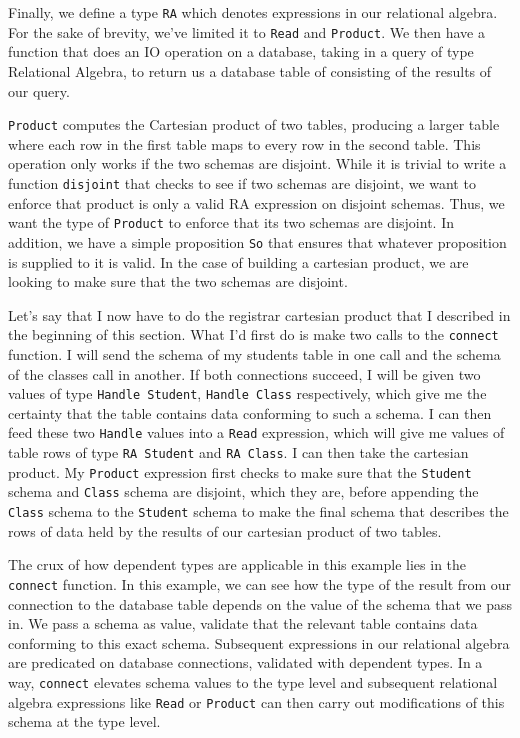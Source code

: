 Finally, we define a type \texttt{RA} which denotes expressions in our
relational algebra. For the sake of brevity, we've limited it to \texttt{Read}
and \texttt{Product}. We then have a function that does an IO operation on a
database, taking in a query of type Relational Algebra, to return us a database
table of consisting of the results of our query. 

\texttt{Product} computes the Cartesian product of two tables, producing a
larger table where each row in the first table maps to every row in the second
table. This operation only works if the two schemas are disjoint. While it is
trivial to write a function \texttt{disjoint} that checks to see if two schemas
are disjoint, we want to enforce that product is only a valid RA expression on
disjoint schemas. Thus, we want the type of \texttt{Product} to enforce that its
two schemas are disjoint. In addition, we have a simple proposition \texttt{So}
that ensures that whatever proposition is supplied to it is valid. In the case
of building a cartesian product, we are looking to make sure that the two
schemas are disjoint. 

Let's say that I now have to do the registrar cartesian product that I described
in the beginning of this section. What I'd first do is make two calls to the
\texttt{connect} function. I will send the schema of my students table in one
call and the schema of the classes call in another. If both connections succeed,
I will be given two values of type \texttt{Handle Student}, \texttt{Handle
Class} respectively, which give me the certainty that the table contains data
conforming to such a schema. I can then feed these two \texttt{Handle} values into a
\texttt{Read} expression, which will give me values of table rows of type
\texttt{RA Student} and \texttt{RA Class}. I can then take the cartesian
product. My \texttt{Product} expression first checks to make sure that the
\texttt{Student} schema and \texttt{Class} schema are disjoint, which they are,
before appending the \texttt{Class} schema to the \texttt{Student} schema to
make the final schema that describes the rows of data held by the results of our
cartesian product of two tables. 

The crux of how dependent types are applicable in this example lies in the
\texttt{connect} function. In this example, we can see how the type of the
result from our connection to the database table depends on the value of the
schema that we pass in. We pass a schema as value, validate that the relevant
table contains data conforming to this exact schema. Subsequent expressions in
our relational algebra are predicated on database connections, validated with
dependent types. In a way, \texttt{connect} elevates schema values to the type
level and subsequent relational algebra expressions like \texttt{Read} or
\texttt{Product} can then carry out modifications of this schema at the type
level. 

